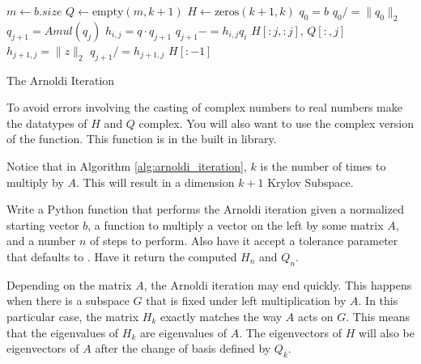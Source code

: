 \begin{algorithm}
\begin{algorithmic}[1]
	\State $m \gets b.size$						
	\State $Q \gets \text{empty}\left(m, k+1\right)$
	\State $H \gets \text{zeros}\left( k+1, k\right)$
	\State $q_0 = b$							
	\State $q_0 /= \|q_0\|_2$						
								
		\State $q_{j+1} = Amul \left(q_j\right)$		
							
			\State $h_{i,j} = q \cdot q_{j+1}$		
			\State $q_{j+1} -= h_{i,j} q_i$
		\EndFor
							
			\State {} $H[:j,:j]$, $Q[:,j]$
		\EndIf
		\State $h_{j+1,j} = \|z\|_2$				
		\State $q_{j+1} /= h_{j+1,j}$				
	\EndFor
	\State {} $H[:-1]$				
\EndProcedure
\end{algorithmic}
\caption{The Arnoldi Iteration}
\label{alg:arnoldi_iteration}
\end{algorithm}

\begin{info}
To avoid errors involving the casting of complex numbers to real numbers make the datatypes of $H$ and $Q$ complex.
You will also want to use the complex version of the  function.
This function is in the built in  library.
\end{info}

Notice that in Algorithm \ref{alg:arnoldi_iteration}, $k$ is the number of times to multiply by $A$.
This will result in a dimension $k+1$ Krylov Subspace.

\begin{problem}
Write a Python function that performs the Arnoldi iteration given a normalized starting vector $b$, a function to multiply a vector on the left by some matrix $A$, and a number $n$ of steps to perform.
Also have it accept a tolerance parameter that defaults to .
Have it return the computed $H_n$ and $Q_n$.
\end{problem}

\begin{info}
Depending on the matrix $A$, the Arnoldi iteration may end quickly.
This happens when there is a subspace $G$ that is fixed under left multiplication by $A$.
In this particular case, the matrix $H_k$ exactly matches the way $A$ acts on $G$.
This means that the eigenvalues of $H_k$ are eigenvalues of $A$.
The eigenvectors of $H$ will also be eigenvectors of $A$ after the change of basis defined by $Q_k$.
\end{info}

